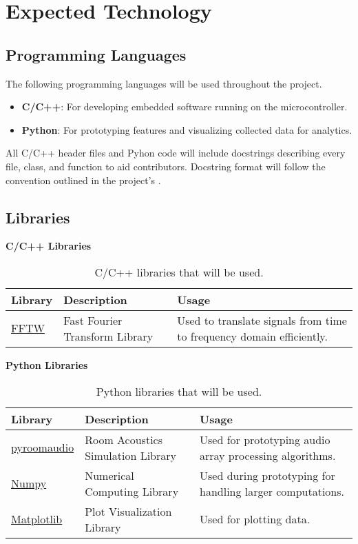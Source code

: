 \documentclass{article}
\begin{document}
\section{Expected Technology}

\subsection{Programming Languages}
The following programming languages will be used throughout the project.
\begin{itemize}
  \item \textbf{C/C++}: For developing embedded software running on the
  microcontroller.
  \item \textbf{Python}: For prototyping features and visualizing collected data
  for analytics.
\end{itemize}

All C/C++ header files and Pyhon code will include docstrings describing every
file, class, and function to aid contributors. Docstring format will follow the
convention outlined in the project's .

\subsection{Libraries}

\textbf{C/C++ Libraries}
\begin{table}[h!]
\centering
\begin{tabularx}{\textwidth}{|l|X|X|}
\hline
\textbf{Library} & \textbf{Description} & \textbf{Usage} \\ \hline
\href{https://www.fftw.org/}{FFTW} & Fast Fourier Transform Library & Used to
translate signals from time to frequency domain efficiently. \\ \hline
\end{tabularx}
\caption{C/C++ libraries that will be used.}
\end{table}

\textbf{Python Libraries}
\begin{table}[h!]
\centering
\begin{tabularx}{\textwidth}{|l|X|X|}
\hline
\textbf{Library} & \textbf{Description} & \textbf{Usage} \\ \hline
\href{https://pypi.org/project/pyroomacoustics/}{pyroomaudio} & Room Acoustics
Simulation Library  & Used for prototyping audio array processing algorithms. \\
\hline
\href{https://numpy.org/}{Numpy} & Numerical Computing Library  & Used during
prototyping for handling larger computations. \\ \hline
\href{https://matplotlib.org/}{Matplotlib} & Plot Visualization Library  & Used
for plotting data. \\ \hline
\end{tabularx}
\caption{Python libraries that will be used.}
\end{table}
\end{document}

